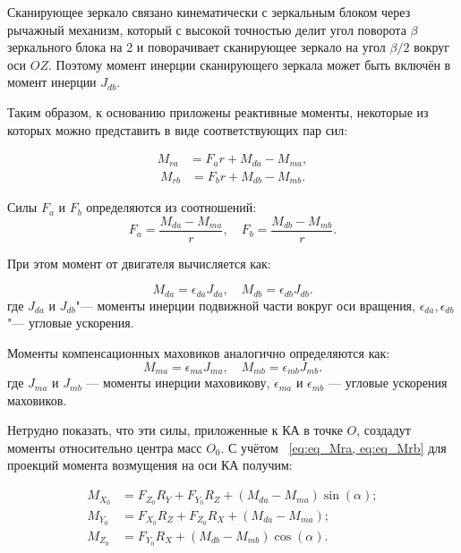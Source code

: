 Сканирующее зеркало связано кинематически с зеркальным блоком через рычажный механизм, который с высокой точностью делит угол поворота $\beta$ зеркального блока на 2 и поворачивает сканирующее зеркало на угол $\beta/2$ вокруг оси $OZ$. Поэтому момент инерции сканирующего зеркала может быть включён в момент инерции $J_{db}$.

Таким образом, к основанию приложены реактивные моменты, некоторые из которых можно представить в виде соответствующих пар сил:

\begin{equation}
	\label{eq:eq_Mra}
	\begin{alignedat}{2}
		M_{ra} &= F_a r + M_{da} - M_{ma},
	\end{alignedat}
\end{equation}
\begin{equation}
	\label{eq:eq_Mrb}
	\begin{alignedat}{2}
		M_{rb} &= F_b r + M_{db} - M_{mb}.
	\end{alignedat}
\end{equation}

Силы $F_a$ и $F_b$ определяются из соотношений:
\begin{equation}
	\label{eq:eq_F0_proect}
	F_a = \dfrac{M_{da}-M_{ma}}{r}, \quad
	F_b = \dfrac{M_{db}-M_{mb}}{r}.
\end{equation}

При этом момент от двигателя вычисляется как:

\begin{equation}
	\label{eq:eq_Mda}
	M_{da} = \epsilon_{da}J_{da}, \quad
	M_{db} = \epsilon_{db}J_{db}.
\end{equation}
где \(J_{da}\) и \(J_{db}\)"--- моменты инерции подвижной части вокруг оси вращения, \(\epsilon_{da},\epsilon_{db}\)"--- угловые ускорения.

Моменты компенсационных маховиков аналогично определяются как:
\begin{equation}
	\label{eq:eq_Mda}
	M_{ma} = \epsilon_{ma}J_{ma}, \quad
	M_{mb} = \epsilon_{mb}J_{mb}.
\end{equation}
где $J_{ma}$ и $J_{mb}$ — моменты инерции маховикову,  $\epsilon_{ma}$ и $\epsilon_{mb}$ —  угловые ускорения маховиков.

Нетрудно показать, что эти силы, приложенные к КА в точке $O$, создадут моменты относительно центра масс $O_0$. С учётом ~\cref{eq:eq_Mra, eq:eq_Mrb} для проекций момента возмущения на оси КА получим:

	\begin{equation}
		\label{eq:eq_M_proect}
		\begin{aligned}
			M_{X_0} &= F_{Z_0}R_Y+F_{Y_0}R_Z+(M_{da}-M_{ma})\sin(\alpha); \\
			M_{Y_0} &= F_{X_0}R_Z+F_{Z_0}R_X+(M_{da}-M_{ma});\\
			M_{Z_0} &= F_{Y_0}R_X+(M_{db}-M_{mb})\cos(\alpha).
		\end{aligned}	
	\end{equation}


